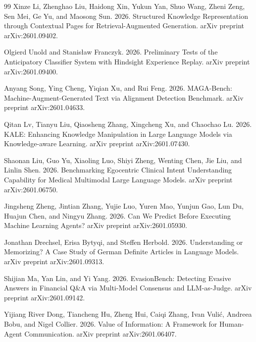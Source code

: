 \documentclass{article}
\begin{document}
\begin{thebibliography}{99}
Xinze Li, Zhenghao Liu, Haidong Xin, Yukun Yan, Shuo Wang, Zheni Zeng, Sen Mei, Ge Yu, and Maosong Sun. 2026. Structured Knowledge Representation through Contextual Pages for Retrieval-Augmented Generation. arXiv preprint arXiv:2601.09402.

Olgierd Unold and Stanisław Franczyk. 2026. Preliminary Tests of the Anticipatory Classifier System with Hindsight Experience Replay. arXiv preprint arXiv:2601.09400.

Anyang Song, Ying Cheng, Yiqian Xu, and Rui Feng. 2026. MAGA-Bench: Machine-Augment-Generated Text via Alignment Detection Benchmark. arXiv preprint arXiv:2601.04633.

Qitan Lv, Tianyu Liu, Qiaosheng Zhang, Xingcheng Xu, and Chaochao Lu. 2026. KALE: Enhancing Knowledge Manipulation in Large Language Models via Knowledge-aware Learning. arXiv preprint arXiv:2601.07430.

Shaonan Liu, Guo Yu, Xiaoling Luo, Shiyi Zheng, Wenting Chen, Jie Liu, and Linlin Shen. 2026. Benchmarking Egocentric Clinical Intent Understanding Capability for Medical Multimodal Large Language Models. arXiv preprint arXiv:2601.06750.

Jingsheng Zheng, Jintian Zhang, Yujie Luo, Yuren Mao, Yunjun Gao, Lun Du, Huajun Chen, and Ningyu Zhang. 2026. Can We Predict Before Executing Machine Learning Agents? arXiv preprint arXiv:2601.05930.

Jonathan Drechsel, Erisa Bytyqi, and Steffen Herbold. 2026. Understanding or Memorizing? A Case Study of German Definite Articles in Language Models. arXiv preprint arXiv:2601.09313.

Shijian Ma, Yan Lin, and Yi Yang. 2026. EvasionBench: Detecting Evasive Answers in Financial Q\&A via Multi-Model Consensus and LLM-as-Judge. arXiv preprint arXiv:2601.09142.

Yijiang River Dong, Tiancheng Hu, Zheng Hui, Caiqi Zhang, Ivan Vulić, Andreea Bobu, and Nigel Collier. 2026. Value of Information: A Framework for Human-Agent Communication. arXiv preprint arXiv:2601.06407.

\end{thebibliography}
\end{document}
